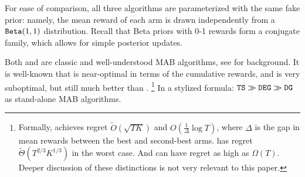 \documentclass[../competing_bandits.tex]{subfiles}
\begin{document}
For ease of comparison, all three algorithms are parameterized with the same fake prior: namely, the mean reward of each arm is drawn independently from a $\mathtt{Beta}(1,1)$ distribution. Recall that Beta priors with 0-1 rewards form a conjugate family, which allows for simple posterior updates.

Both \DEG and \TS are classic and well-understood MAB algorithms, see \cite{Bubeck-survey12,TS-survey-FTML18} for background. It is well-known that \TS is near-optimal in terms of the cumulative rewards, and \DEG is very suboptimal, but still much better than \DG.%
\footnote{Formally, \TS achieves regret 
    $\tilde{O}(\sqrt{TK})$ and
    $O(\tfrac{1}{\Delta} \log T)$,
where $\Delta$ is the gap in mean rewards between the best and second-best arms. \DEG has regret $\tilde{\Theta}(T^{2/3} K^{1/3})$ in the worst case. And \DG can have regret as high as $\Omega(T)$. Deeper discussion of these distinctions is not very relevant to this paper.}
In a stylized formula:
    $ \mathtt{TS} \gg \mathtt{DEG} \gg \mathtt{DG} $
as stand-alone MAB algorithms.



\end{document}
